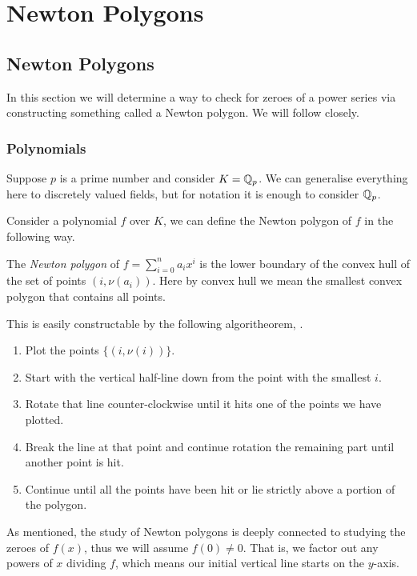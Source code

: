 \chapter{Newton Polygons}

\section{Newton Polygons}

In this section we will determine a way to check for zeroes of a power series via constructing
something called a Newton polygon. We will follow \cite[Section~7.4]{Gouvea} closely.

\subsection{Polynomials}

Suppose $p$ is a prime number and consider $K = \mathbb{Q}_p$. We can generalise everything here to
discretely valued fields, but for notation it is enough to consider $\mathbb{Q}_p$.

Consider a polynomial $f$ over $K$, we can define the Newton polygon of $f$ in the following way.

\begin{definition}
    The \emph{Newton polygon} of $f = \sum_{i=0}^n a_i x^i$ is the lower boundary of the convex hull
    of the set of points $(i,\nu(a_i))$.
    Here by convex hull we mean the smallest convex polygon that contains all points.
\end{definition}

This is easily constructable by the following algoritheorem, \cite[Pages~210-211]{Gouvea} .

\begin{enumerate}
    \item Plot the points $\{(i,\nu (i) )\}$.
    \item Start with the vertical half-line down from the point with the smallest $i$.
    \item Rotate that line counter-clockwise until it hits one of the points we have plotted.
    \item Break the line at that point and continue rotation the remaining part until another point
    is hit.
    \item Continue until all the points have been hit or lie strictly above a portion of the
    polygon.
\end{enumerate}

As mentioned, the study of Newton polygons is deeply connected to studying the zeroes of $f(x)$,
thus we will assume $f(0) \neq 0$. That is, we factor out any powers of $x$ dividing $f$, which
means our initial vertical line starts on the $y$-axis.

